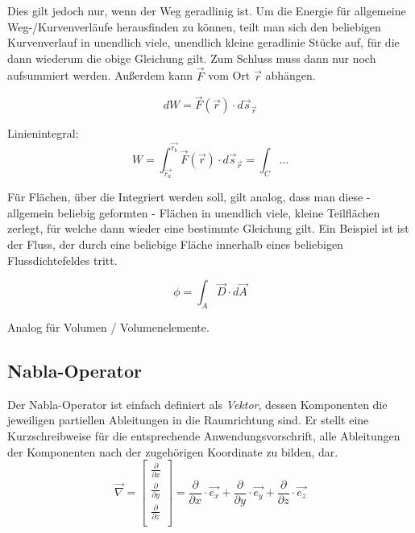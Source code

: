 \documentclass[11pt, a4paper]{article}
\begin{document}
\begin{figure}[H]
\centering
{}
\end{figure}

Dies gilt jedoch nur, wenn der Weg geradlinig ist. Um die Energie für allgemeine Weg-/Kurvenverläufe herausfinden zu können, teilt man sich den beliebigen Kurvenverlauf in unendlich viele, unendlich kleine geradlinie Stücke auf, für die dann wiederum die obige Gleichung gilt. Zum Schluss muss dann nur noch aufsummiert werden. Außerdem kann $\vec{F}$ vom Ort $\vec{r}$ abhängen.

\begin{figure}[H]
\centering
{}
\end{figure}

\[dW = \vec{F}(\vec{r}) \cdot d\vec{s}_{\vec{r}}\]

Linienintegral:
\[W = \int_{\vec{r_{a}}}^{\vec{r_{b}}}{\vec{F}(\vec{r}) \cdot d\vec{s}_{\vec{r}}} = \int_{C}{...}\]

Für Flächen, über die Integriert werden soll, gilt analog, dass man diese - allgemein beliebig geformten - Flächen in unendlich viele, kleine Teilflächen zerlegt, für welche dann wieder eine bestimmte Gleichung gilt. Ein Beispiel ist ist der Fluss, der durch eine beliebige Fläche innerhalb eines beliebigen Flussdichtefeldes tritt.

\[\phi = \int_{A}{\vec{D} \cdot d \vec{A}}\]

Analog für Volumen / Volumenelemente.

\subsection{Nabla-Operator}
Der Nabla-Operator ist einfach definiert als \emph{Vektor}, dessen Komponenten die jeweiligen partiellen Ableitungen in die Raumrichtung sind. Er stellt eine Kurzschreibweise für die entsprechende Anwendungsvorschrift, alle Ableitungen der Komponenten nach der zugehörigen Koordinate zu bilden, dar.
\[\vec{\nabla} =
  \begin{bmatrix}
    \frac{\partial}{\partial x}\\
    \frac{\partial}{\partial y}\\
    \frac{\partial}{\partial z}\\
  \end{bmatrix}
    = \frac{\partial}{\partial x} \cdot \vec{e_{x}}+ \frac{\partial}{\partial y} \cdot \vec{e_{y}}  + \frac{\partial}{\partial z} \cdot \vec{e_{z}}
\]
\end{document}
